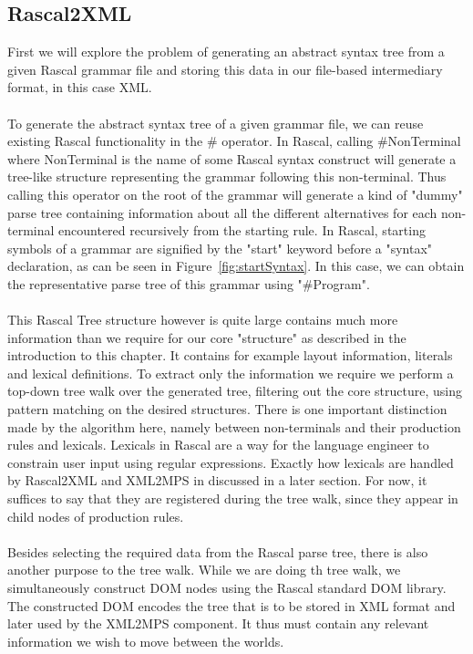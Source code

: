 \documentclass[a4paper, 11pt]{article}
\begin{document}
\subsection{Rascal2XML}
First we will explore the problem of generating an abstract syntax tree from a given Rascal grammar file and storing this data in our file-based intermediary format, in this case XML. 
\\\\
To generate the abstract syntax tree of a given grammar file, we can reuse existing Rascal functionality in the \# operator. In Rascal, calling #NonTerminal where NonTerminal is the name of some Rascal syntax construct will generate a tree-like structure representing the grammar following this non-terminal. Thus calling this operator on the root of the grammar will generate a kind of "dummy" parse tree containing information about all the different alternatives for each non-terminal encountered recursively from the starting rule. In Rascal, starting symbols of a grammar are signified by the "start" keyword before a "syntax" declaration, as can be seen in Figure~\ref{fig:startSyntax}. In this case, we can obtain the representative parse tree of this grammar using "\#Program". 
\\\\
This Rascal Tree structure however is quite large contains much more information than we require for our core "structure" as described in the introduction to this chapter. It contains for example layout information, literals and  lexical definitions. To extract only the information we require we perform a top-down tree walk over the generated tree, filtering out the core structure, using pattern matching on the desired structures. There is one important distinction made by the algorithm here, namely between non-terminals and their production rules and lexicals. Lexicals in Rascal are a way for the language engineer to constrain user input using regular expressions. Exactly how lexicals are handled by Rascal2XML and XML2MPS in discussed in a later section. For now, it suffices to say that they are registered during the tree walk, since they appear in child nodes of production rules. 
\\\\
Besides selecting the required data from the Rascal parse tree, there is also another purpose to the tree walk. While we are doing th tree walk, we simultaneously construct DOM nodes using the Rascal standard DOM library. 
The constructed DOM encodes the tree that is to be stored in XML format and later used by the XML2MPS component. It thus must contain any relevant information we wish to move between the worlds. 
\end{document}
